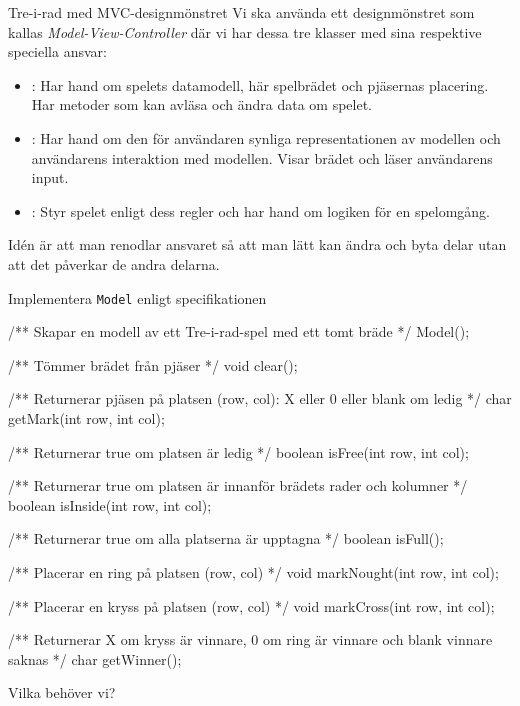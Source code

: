 \documentclass{lecturenotes}
\begin{document}
\begin{Slide}{Tre-i-rad med MVC-designmönstret}
Vi ska använda ett designmönstret som kallas \textit{Model-View-Controller} där vi har dessa tre klasser med sina respektive speciella ansvar:
\begin{itemize}
\item {}: Har hand om spelets datamodell, här spelbrädet och pjäsernas placering. Har metoder som kan avläsa och ändra data om spelet.
\item {}: Har hand om den för användaren synliga representationen av modellen och användarens interaktion med modellen. Visar brädet och läser användarens input.
\item {}: Styr spelet enligt dess regler och har hand om logiken för en spelomgång.
\end{itemize}
Idén är att man renodlar ansvaret så att man lätt kan ändra och byta delar utan att det påverkar de andra delarna. 
\end{Slide}

\begin{Slide}{Implementera \texttt{Model} enligt specifikationen}
\vspace{-2em}
\begin{ClassSpec}{}
/** Skapar en modell av ett Tre-i-rad-spel med ett tomt bräde */
Model();

/** Tömmer brädet från pjäser */
void clear();

/** Returnerar pjäsen på platsen (row, col): X eller 0 eller blank om ledig  */
char getMark(int row, int col);

/** Returnerar true om platsen är ledig */
boolean isFree(int row, int col);

/** Returnerar true om platsen är innanför brädets rader och kolumner */
boolean isInside(int row, int col);

/** Returnerar true om alla platserna är upptagna */
boolean isFull();

/** Placerar en ring på platsen (row, col) */
void markNought(int row, int col);

/** Placerar en kryss på platsen (row, col) */
void markCross(int row, int col);

/** Returnerar X om kryss är vinnare, 0 om ring är vinnare och blank vinnare saknas */
char getWinner();
\end{ClassSpec}
\footnotesize\vspace{-0.2em} Vilka  behöver vi? 
\end{Slide}
\end{document}
